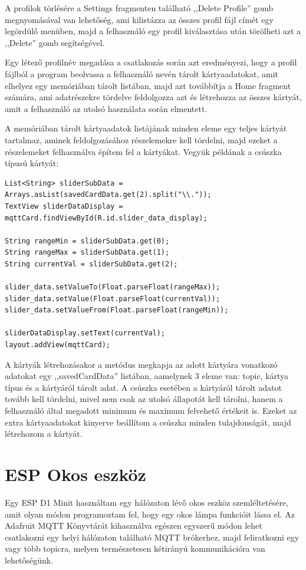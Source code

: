 \documentclass[
]{thesis-ekf}
\theoremstyle{definition}
\theoremstyle{remark}
\begin{document}
A profilok törlésére a Settings fragmenten található ,,Delete Profile'' gomb megnyomásával van lehetőség,
ami kilistázza az összes profil fájl címét egy legördülő menüben, majd a felhasználó egy profil kiválasztása után
törölheti azt a ,,Delete'' gomb segítségével.

Egy létező profilnév megadása a csatlakozás során azt eredményezi, hogy a profil fájlból a program beolvassa a felhasználó nevén
tárolt kártyaadatokat, amit elhelyez egy memóriában tárolt listában, majd azt továbbítja a Home fragment számára, ami
adatrészekre tördelve feldolgozza azt és létrehozza az összes kártyát, amit a felhasználó az utolsó használata során
elmentett.

A memóriában tárolt kártyaadatok listájának minden eleme egy teljes kártyát tartalmaz, aminek feldolgozásához részelemekre
kell tördelni, majd ezeket a részelemeket felhasználva építem fel a kártyákat. Vegyük példának a csúszka típusú kártyát:

\lstset{language=Java}
\begin{lstlisting}[frame=single]
List<String> sliderSubData = Arrays.asList(savedCardData.get(2).split("\\."));
TextView sliderDataDisplay = mqttCard.findViewById(R.id.slider_data_display);

String rangeMin = sliderSubData.get(0);
String rangeMax = sliderSubData.get(1);
String currentVal = sliderSubData.get(2);

slider_data.setValueTo(Float.parseFloat(rangeMax));
slider_data.setValue(Float.parseFloat(currentVal));
slider_data.setValueFrom(Float.parseFloat(rangeMin));

sliderDataDisplay.setText(currentVal);
layout.addView(mqttCard);
\end{lstlisting}

A kártyák létrehozásakor a metódus megkapja az adott kártyára vonatkozó adatokat egy ,,savedCardData'' listában, aamelynek
3 eleme van: topic, kártya típus és a kártyáról tárolt adat. A csúszka esetében a kártyáról tárolt adatot tovább kell tördelni,
mivel nem csak az utolsó állapotát kell tárolni, hanem a felhasználó által megadott minimum és maximum felvehető értékeit is.
Ezeket az extra kártyaadatokat kinyerve beállítom a csúszka minden tulajdonságát, majd létrehozom a kártyát.

\section{ESP Okos eszköz}
Egy ESP D1 Minit használtam egy hálózaton lévő okos eszköz szemléltetésére, amit olyan módon programoztam fel, hogy egy
okos lámpa funkcióit lássa el. Az Adafruit MQTT Könyvtárát\cite{adafruit} kihasználva egészen egyszerű módon lehet csatlakozni
egy helyi hálózaton található MQTT brókerhez, majd feliratkozni egy vagy több topicra, melyen természetesen kétirányú
kommunikációra van lehetőségünk. 
\end{document}
